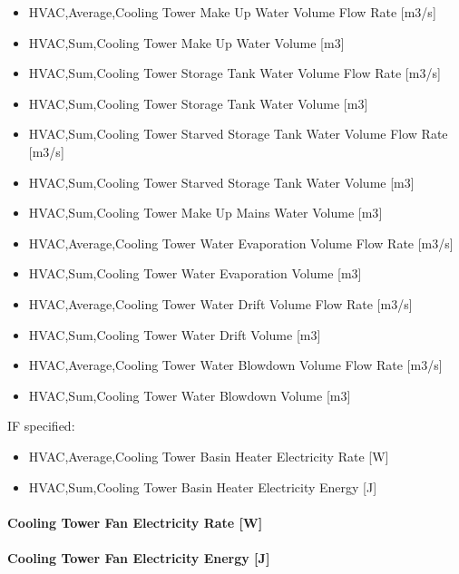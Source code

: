 \begin{itemize}
\item
  HVAC,Average,Cooling Tower Make Up Water Volume Flow Rate {[}m3/s{]}
\item
  HVAC,Sum,Cooling Tower Make Up Water Volume {[}m3{]}
\item
  HVAC,Sum,Cooling Tower Storage Tank Water Volume Flow Rate {[}m3/s{]}
\item
  HVAC,Sum,Cooling Tower Storage Tank Water Volume {[}m3{]}
\item
  HVAC,Sum,Cooling Tower Starved Storage Tank Water Volume Flow Rate {[}m3/s{]}
\item
  HVAC,Sum,Cooling Tower Starved Storage Tank Water Volume {[}m3{]}
\item
  HVAC,Sum,Cooling Tower Make Up Mains Water Volume {[}m3{]}
\item
  HVAC,Average,Cooling Tower Water Evaporation Volume Flow Rate {[}m3/s{]}
\item
  HVAC,Sum,Cooling Tower Water Evaporation Volume {[}m3{]}
\item
  HVAC,Average,Cooling Tower Water Drift Volume Flow Rate {[}m3/s{]}
\item
  HVAC,Sum,Cooling Tower Water Drift Volume {[}m3{]}
\item
  HVAC,Average,Cooling Tower Water Blowdown Volume Flow Rate {[}m3/s{]}
\item
  HVAC,Sum,Cooling Tower Water Blowdown Volume {[}m3{]}
\end{itemize}

IF specified:

\begin{itemize}
\item
  HVAC,Average,Cooling Tower Basin Heater Electricity Rate {[}W{]}
\item
  HVAC,Sum,Cooling Tower Basin Heater Electricity Energy {[}J{]}
\end{itemize}

\paragraph{Cooling Tower Fan Electricity Rate {[}W{]}}\label{cooling-tower-fan-electric-power-w-1}

\paragraph{Cooling Tower Fan Electricity Energy {[}J{]}}\label{cooling-tower-fan-electric-energy-j-1}

